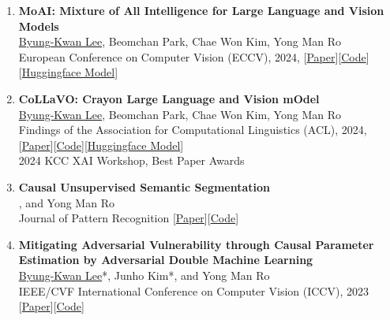 \documentclass[a4paper,11pt]{article}
\begin{document}
{\begin{enumerate}[leftmargin=2.2em, labelsep=0.6em, align=left, itemindent=0em, label={\color{accentDark}\textbf{\arabic*.}}]
\item \textbf{MoAI: Mixture of All Intelligence for Large Language and Vision Models}
\\\vspace{1mm}\underline{Byung-Kwan Lee}, Beomchan Park, Chae Won Kim, Yong Man Ro
\\\vspace{2mm}European Conference on Computer Vision (ECCV), 2024, [\href{https://arxiv.org/abs/2403.07508}{Paper}][\href{https://github.com/ByungKwanLee/MoAI}{Code}][\href{https://huggingface.co/collections/BK-Lee/collavo-and-moai-66561821e16f34509f5c2040}{Huggingface Model}]

\item \textbf{CoLLaVO: Crayon Large Language and Vision mOdel}
\\\vspace{1mm}\underline{Byung-Kwan Lee}, Beomchan Park, Chae Won Kim, Yong Man Ro
\\\vspace{2mm}Findings of the Association for Computational Linguistics (ACL), 2024, [\href{https://arxiv.org/abs/2402.11248}{Paper}][\href{https://github.com/ByungKwanLee/CoLLaVO}{Code}][\href{https://huggingface.co/collections/BK-Lee/collavo-and-moai-66561821e16f34509f5c2040}{Huggingface Model}]
\\\vspace{2mm}2024 KCC XAI Workshop, Best Paper Awards

\item \textbf{Causal Unsupervised Semantic Segmentation}
\\, and Yong Man Ro
\\\vspace{2mm}Journal of Pattern Recognition [\href{https://arxiv.org/abs/2310.07379}{Paper}][\href{https://github.com/ByungKwanLee/Causal-Unsupervised-Segmentation}{Code}]

\item \textbf{Mitigating Adversarial Vulnerability through Causal Parameter Estimation by Adversarial Double Machine Learning}
\\\vspace{1mm}\underline{Byung-Kwan Lee}*, Junho Kim*, and Yong Man Ro
\\\vspace{2mm}IEEE/CVF International Conference on Computer Vision (ICCV), 2023 [\href{https://arxiv.org/abs/2307.07250}{Paper}][\href{https://github.com/ByungKwanLee/Double-Debiased-Adversary}{Code}]


\end{enumerate}}
\end{document}
